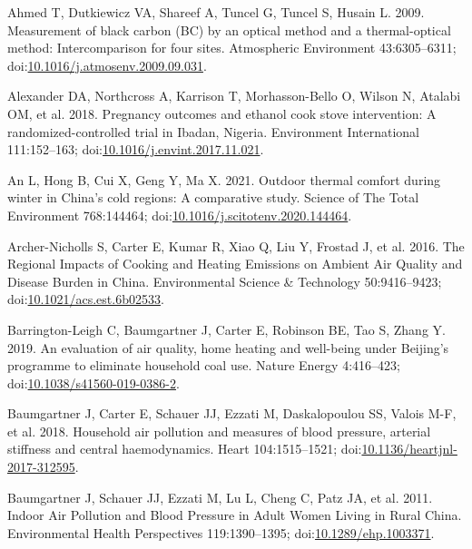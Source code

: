 \documentclass[
  letterpaper,
  DIV=11,
  numbers=noendperiod]{scrartcl}
\newlength{\cslhangindent}
\newlength{\cslentryspacingunit} %
\newenvironment{CSLReferences}[2] %
 {%
  \setlength{\parindent}{0pt}
  \ifodd #1
  \let\oldpar\par
  \def\par{\hangindent=\cslhangindent\oldpar}
  \fi
  \setlength{\parskip}{#2\cslentryspacingunit}
 }%
 {}
\begin{document}
\hypertarget{refs}{}
\begin{CSLReferences}{1}{0}
\leavevmode{}%
Ahmed T, Dutkiewicz VA, Shareef A, Tuncel G, Tuncel S, Husain L. 2009.
Measurement of black carbon ({BC}) by an optical method and a
thermal-optical method: {Intercomparison} for four sites. Atmospheric
Environment 43:6305--6311;
doi:\href{https://doi.org/10.1016/j.atmosenv.2009.09.031}{10.1016/j.atmosenv.2009.09.031}.

\leavevmode{}%
Alexander DA, Northcross A, Karrison T, Morhasson-Bello O, Wilson N,
Atalabi OM, et al. 2018. Pregnancy outcomes and ethanol cook stove
intervention: {A} randomized-controlled trial in {Ibadan}, {Nigeria}.
Environment International 111:152--163;
doi:\href{https://doi.org/10.1016/j.envint.2017.11.021}{10.1016/j.envint.2017.11.021}.

\leavevmode{}%
An L, Hong B, Cui X, Geng Y, Ma X. 2021. Outdoor thermal comfort during
winter in {China}'s cold regions: {A} comparative study. Science of The
Total Environment 768:144464;
doi:\href{https://doi.org/10.1016/j.scitotenv.2020.144464}{10.1016/j.scitotenv.2020.144464}.

\leavevmode{}%
Archer-Nicholls S, Carter E, Kumar R, Xiao Q, Liu Y, Frostad J, et al.
2016. The {Regional Impacts} of {Cooking} and {Heating Emissions} on
{Ambient Air Quality} and {Disease Burden} in {China}. Environmental
Science \& Technology 50:9416--9423;
doi:\href{https://doi.org/10.1021/acs.est.6b02533}{10.1021/acs.est.6b02533}.

\leavevmode{}%
Barrington-Leigh C, Baumgartner J, Carter E, Robinson BE, Tao S, Zhang
Y. 2019. An evaluation of air quality, home heating and well-being under
{Beijing}'s programme to eliminate household coal use. Nature Energy
4:416--423;
doi:\href{https://doi.org/10.1038/s41560-019-0386-2}{10.1038/s41560-019-0386-2}.

\leavevmode{}%
Baumgartner J, Carter E, Schauer JJ, Ezzati M, Daskalopoulou SS, Valois
M-F, et al. 2018. Household air pollution and measures of blood
pressure, arterial stiffness and central haemodynamics. Heart
104:1515--1521;
doi:\href{https://doi.org/10.1136/heartjnl-2017-312595}{10.1136/heartjnl-2017-312595}.

\leavevmode{}%
Baumgartner J, Schauer JJ, Ezzati M, Lu L, Cheng C, Patz JA, et al.
2011. Indoor {Air Pollution} and {Blood Pressure} in {Adult Women
Living} in {Rural China}. Environmental Health Perspectives
119:1390--1395;
doi:\href{https://doi.org/10.1289/ehp.1003371}{10.1289/ehp.1003371}.


\end{CSLReferences}
\end{document}
